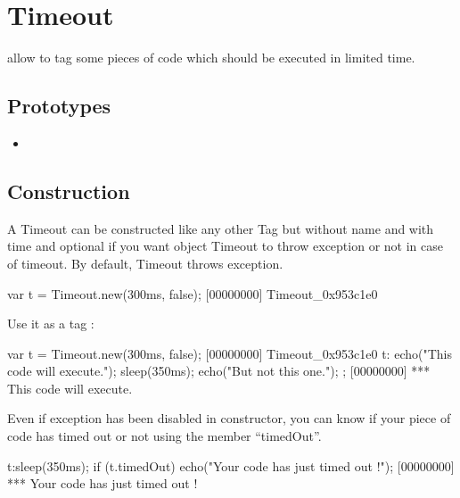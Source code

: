 \section{Timeout}

 allow to tag some pieces of code which should be
executed in limited time.

\subsection{Prototypes}
\begin{itemize}
\item {}
\end{itemize}

\subsection{Construction}
A Timeout can be constructed like any other Tag but without name and
with time and optional if you want object Timeout to throw exception
or not in case of timeout. By default, Timeout throws exception.

\begin{urbiscript}
var t = Timeout.new(300ms, false);
[00000000] Timeout_0x953c1e0
\end{urbiscript}

Use it as a tag :

\begin{urbiscript}
var t = Timeout.new(300ms, false);
[00000000] Timeout_0x953c1e0
t:{
  echo("This code will execute.");
  sleep(350ms);
  echo("But not this one.");
};
[00000000] *** This code will execute.
\end{urbiscript}

Even if exception has been disabled in constructor, you can know if
your piece of code has timed out or not using the member ``timedOut''.

\begin{urbiscript}
t:sleep(350ms);
if (t.timedOut)
  echo("Your code has just timed out !");
[00000000] *** Your code has just timed out !
\end{urbiscript}

